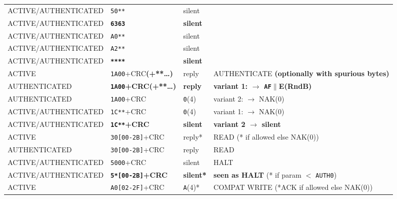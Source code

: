\begin{longtable}{l l l l}
ACTIVE/AUTHENTICATED & \texttt{50**}                       & silent          &                                             \\
ACTIVE/AUTHENTICATED & \textbf{\texttt{6363}}              & \textbf{silent} &                                             \\
ACTIVE/AUTHENTICATED & \texttt{A0**}                       & silent          &                                             \\
ACTIVE/AUTHENTICATED & \texttt{A2**}                       & silent          &                                             \\
ACTIVE/AUTHENTICATED & \textbf{\texttt{****}}              & \textbf{silent} &                                             \\
ACTIVE               & \texttt{1A00}+CRC\textbf{(+**\dots)}                   & reply           & AUTHENTICATE \textbf{(optionally with spurious bytes)}                               \\
AUTHENTICATED        & \textbf{\texttt{1A00}+CRC(+**\dots)}          & \textbf{reply}  & \textbf{variant 1: $\rightarrow$ 
 \texttt{AF}$\|$E(RndB)}              \\
AUTHENTICATED        & \texttt{1A00}+CRC                   & \texttt{0}(4)            & variant 2: $\rightarrow$ 
 NAK(0)              \\
ACTIVE/AUTHENTICATED & \texttt{1C**}+CRC                   & \texttt{0}(4) & variant 1: $\rightarrow$ 
 NAK(0)              \\
ACTIVE/AUTHENTICATED & \textbf{\texttt{1C**}+CRC}          & \textbf{silent} & \textbf{variant 2 $\rightarrow$ 
 silent}              \\
ACTIVE               & \texttt{30[00-2B]}+CRC              & reply*          & READ (* if allowed else NAK(0))             \\
AUTHENTICATED        & \texttt{30[00-2B]}+CRC              & reply           & READ                                        \\
ACTIVE/AUTHENTICATED & \texttt{5000}+CRC                   & silent          & HALT                                        \\
ACTIVE/AUTHENTICATED & \textbf{\texttt{5*[00-2B]}+CRC}     & \textbf{silent*} & \textbf{seen as HALT} (* if param $<$ \texttt{AUTH0})                                        \\
ACTIVE               & \texttt{A0[02-2F]}+CRC              & \texttt{A}(4)*           & COMPAT WRITE (*ACK if allowed else NAK(0))  \\

\end{longtable}
